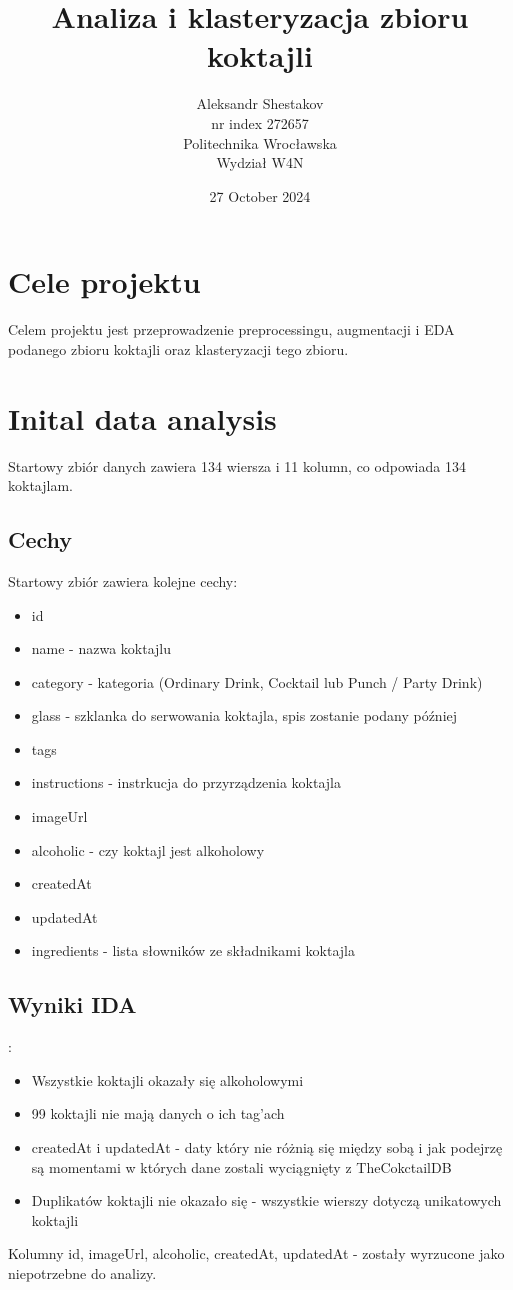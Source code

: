 \documentclass{article}
\title{\textbf{Analiza i klasteryzacja zbioru koktajli}}
\author{Aleksandr Shestakov \\
        nr index 272657 \\
        Politechnika Wrocławska \\
        Wydział W4N \\}
\date{27 October 2024}
\begin{document}
\maketitle

\vspace{100cm}

\tableofcontents

\section{Cele projektu}
Celem projektu jest przeprowadzenie preprocessingu, augmentacji i EDA podanego zbioru koktajli oraz klasteryzacji tego zbioru.

\section{Inital data analysis}
Startowy zbiór danych zawiera 134 wiersza i 11 kolumn, co odpowiada 134 koktajlam.
\subsection{Cechy}
Startowy zbiór zawiera kolejne cechy:
\begin{itemize}
    \item id
    \item name - nazwa koktajlu
    \item category - kategoria (Ordinary Drink, Cocktail lub Punch / Party Drink)
    \item glass - szklanka do serwowania koktajla, spis zostanie podany później
    \item tags
    \item instructions - instrkucja do przyrządzenia koktajla
    \item imageUrl
    \item alcoholic - czy koktajl jest alkoholowy
    \item createdAt
    \item updatedAt
    \item ingredients - lista słowników ze składnikami koktajla
\end{itemize}


\subsection{Wyniki IDA}:
\begin{itemize}
    \item Wszystkie koktajli okazały się alkoholowymi
    \item 99 koktajli nie mają danych o ich tag'ach
    \item createdAt i updatedAt - daty który nie różnią się między sobą i jak podejrzę są momentami w których dane zostali wyciągnięty z TheCokctailDB 
    \item Duplikatów koktajli nie okazało się - wszystkie wierszy dotyczą unikatowych koktajli
\end{itemize}
Kolumny id, imageUrl, alcoholic, createdAt, updatedAt - zostały wyrzucone jako niepotrzebne do analizy.
\end{document}
